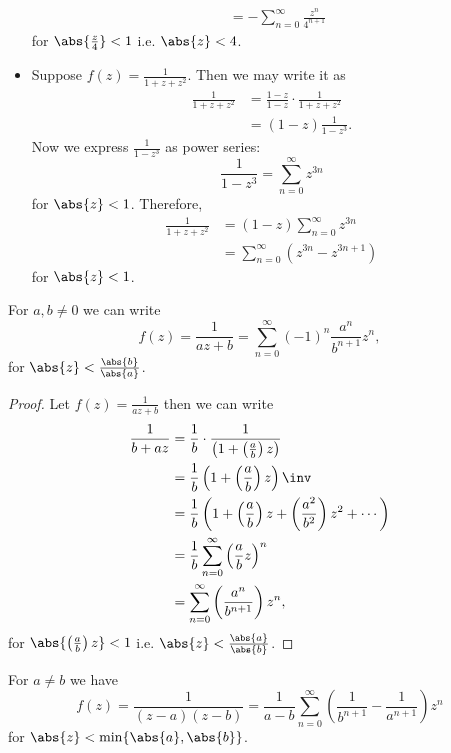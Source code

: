 \documentclass[12pt, a4paper]{article}
\begin{document}
\begin{example}
\begin{itemize}
\[\begin{aligned}
            &= - \sum_{n=0}^{\infty} \frac{z^n}{4^{n+1}} 
        \end{aligned}\]
        for \(\abs{\frac{z}{4}}<1\) i.e. \(\abs{z}<4\).
        \item Suppose \(f(z)= \frac{1}{1+z+z^2}\). Then we may write it as 
        \[\begin{aligned}
            \frac{1}{1+z+z^2} &= \frac{1-z}{1-z} \cdot \frac{1}{1+z+z^2} \\
            &=(1-z)\frac{1}{1-z^3}.
        \end{aligned}\]
        Now we express \(\frac{1}{1-z^3}\) as power series:
        \[\frac{1}{1-z^3} = \sum_{n=0}^{\infty} z^{3n}\]
        for \(\abs{z}<1\). Therefore,
        \[\begin{aligned}
            \frac{1}{1+z+z^2} &= (1-z) \sum_{n=0}^{\infty} z^{3n} \\
            &= \sum_{n=0}^{\infty} (z^{3n}-z^{3n+1})
        \end{aligned}\]
        for \(\abs{z}<1\).
    \end{itemize}
\end{example}

\begin{theorem}
    For \(a,b \neq 0\) we can write 
    \[f(z) = \frac{1}{az+b} = \sum_{n=0}^{\infty} (-1)^n \frac{a^n}{b^{n+1}} z^n,\]
    for \(\abs{z} < \frac{\abs{b}}{\abs{a}}\).
\end{theorem}

\begin{proof}
    Let \(f(z)=\frac{1}{az+b}\) then we can write 
    \[\begin{aligned}
        \frac{1}{b+az} &= \frac{1}{b} \cdot \frac{1}{\left( 1 +\left( \frac{a}{b} \right)z \right)} \\
        &= \frac{1}{b} \left( 1+\left( \frac{a}{b} \right)z \right)\inv \\
        &= \frac{1}{b} \left( 1+ \left( \frac{a}{b} \right)z+ \left( \frac{a^2}{b^2} \right)z^2 + \cdots \right) \\
        &= \frac{1}{b} \sum_{n=0}^{\infty}\left( \frac{a}{b} z \right)^n \\
        &= \sum_{n=0}^{\infty} \left( \frac{a^n}{b^{n+1}} \right) z^n,
    \end{aligned}\]
    for \(\abs{\left( \frac{a}{b} \right)z}<1\) i.e. \(\abs{z}<\frac{\abs{a}}{\abs{b}}\).
\end{proof}

\begin{theorem}
    For \(a \neq b\) we have 
    \[f(z) = \frac{1}{(z-a)(z-b)} = \frac{1}{a-b} \sum_{n=0}^{\infty} \left( \frac{1}{b^{n+1}} - \frac{1}{a^{n+1}}\right) z^n\]
    for \(\abs{z}<\min\{\abs{a},\abs{b}\}\).
\end{theorem}
\end{document}
